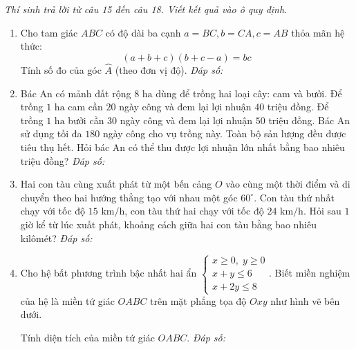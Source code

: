 \documentclass[12pt,a4paper]{article}
\newcommand{\parttitle}[1]{\par\vspace{2pt}{\large\bfseries\color{ink}#1}\par\vspace{1pt}}
\newcommand{\answerbox}{\hfill\textit{Đáp số:}\ \fbox{\rule{0pt}{11pt}\hspace{2.2cm}}}
\begin{document}
\parttitle{PHẦN III. Trắc nghiệm trả lời ngắn}
\textit{Thí sinh trả lời từ câu 15 đến câu 18. Viết kết quả vào ô quy định.}
\begin{enumerate}[resume]
\item Cho tam giác $ABC$ có độ dài ba cạnh $a = BC, b = CA, c = AB$ thỏa mãn hệ thức:
$$(a + b + c)(b + c - a) = bc$$
Tính số đo của góc $\widehat{A}$ (theo đơn vị độ).
\answerbox

\item Bác An có mảnh đất rộng $8\text{ ha}$ dùng để trồng hai loại cây: cam và bưởi. Để trồng $1\text{ ha}$ cam cần $20$ ngày công và đem lại lợi nhuận $40$ triệu đồng. Để trồng $1\text{ ha}$ bưởi cần $30$ ngày công và đem lại lợi nhuận $50$ triệu đồng. Bác An sử dụng tối đa $180$ ngày công cho vụ trồng này. Toàn bộ sản lượng đều được tiêu thụ hết. Hỏi bác An có thể thu được lợi nhuận lớn nhất bằng bao nhiêu triệu đồng?
\answerbox

\item Hai con tàu cùng xuất phát từ một bến cảng $O$ vào cùng một thời điểm và di chuyển theo hai hướng thẳng tạo với nhau một góc $60^\circ$. Con tàu thứ nhất chạy với tốc độ $15\text{ km/h}$, con tàu thứ hai chạy với tốc độ $24\text{ km/h}$. Hỏi sau $1$ giờ kể từ lúc xuất phát, khoảng cách giữa hai con tàu bằng bao nhiêu kilômét?
\answerbox

\item Cho hệ bất phương trình bậc nhất hai ẩn $\begin{cases} x \ge 0,\; y \ge 0 \\ x + y \le 6 \\ x + 2y \le 8 \end{cases}$. Biết miền nghiệm của hệ là miền tứ giác $OABC$ trên mặt phẳng tọa độ $Oxy$ như hình vẽ bên dưới.

\begin{center}
\end{center}

Tính diện tích của miền tứ giác $OABC$.
\answerbox
\end{enumerate}
\end{document}
